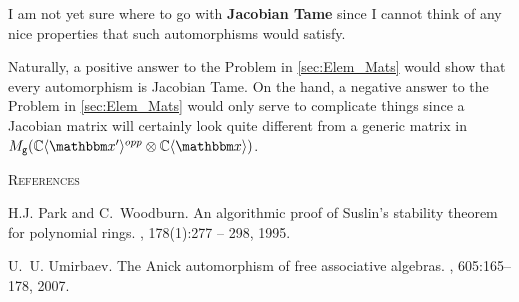 I am not yet sure where to go with {\bf Jacobian Tame} since I cannot think of any nice properties that such automorphisms would satisfy.

Naturally, a positive answer to the Problem in \ref{sec:Elem_Mats} would show that every automorphism is Jacobian Tame.
On the hand, a negative answer to the Problem in \ref{sec:Elem_Mats} would only serve to complicate things since a Jacobian matrix will certainly look quite different from a generic matrix in $M_\ttg(\C\fralg{\bbx'}^{opp}\otimes \C\fralg{\bbx})$.



\begingroup
\renewcommand{\addcontentsline}[3]{}%
\renewcommand{\section}[2]{}%

\vspace{1em}

\begin{center}
	{\normalsize \textsc{References}}
\end{center}


\begin{thebibliography}{PW95}

H.J. Park and C.~Woodburn.
\newblock An algorithmic proof of {S}uslin's stability theorem for polynomial
  rings.
, 178(1):277 -- 298, 1995.

U.~U. Umirbaev.
\newblock The {A}nick automorphism of free associative algebras.
, 605:165--178, 2007.

\end{thebibliography}


\endgroup





